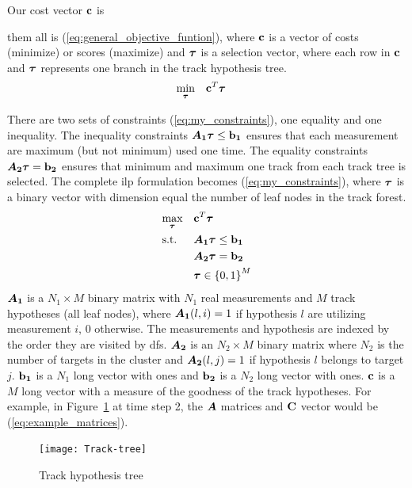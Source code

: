 
Our cost vector \(\boldsymbol{\mathbf{c}}\) is 

 them all is (\ref{eq:general_objective_funtion}), where \(\boldsymbol{\mathbf{c}}\) is a vector of costs (minimize) or scores (maximize) and \(\boldsymbol{\mathbf{\tau}}\) is a selection vector, where each row in \(\boldsymbol{\mathbf{c}}\) and \(\boldsymbol{\mathbf{\tau}}\) represents one branch in the track hypothesis tree.
\begin{equation}
\begin{aligned}
& \underset{\boldsymbol{\mathbf{\tau}}}{\text{min}}
& & \boldsymbol{\mathbf{c}}^T \boldsymbol{\mathbf{\tau}}
\end{aligned}
\label{eq:general_objective_funtion}
\end{equation}

There are two sets of constraints (\ref{eq:my_constraints}), one equality and one inequality. The inequality constraints \(\bm{A_1} \boldsymbol{\mathbf{\tau}} \leq \boldsymbol{\mathbf{b_1}}\) ensures that each measurement are maximum (but not minimum) used one time. The equality constraints \(\bm{A_2} \boldsymbol{\mathbf{\tau}} = \boldsymbol{\mathbf{b_2}}\) ensures that minimum and maximum one track from each track tree is selected. The complete \gls{ilp} formulation becomes (\ref{eq:my_constraints}), where \(\boldsymbol{\mathbf{\tau}}\) is a binary vector with dimension equal the number of leaf nodes in the track forest.
\begin{equation}
\begin{aligned}
&	\underset{\boldsymbol{\mathbf{\tau}}}{\text{max}}
&&	\boldsymbol{\mathbf{c}}^T \boldsymbol{\mathbf{\tau}} \\
&	\text{s.t.}
&&	\bm{A_1} \boldsymbol{\mathbf{\tau}} \leq \boldsymbol{\mathbf{b_1}} 	\\
&&&	\bm{A_2} \boldsymbol{\mathbf{\tau}} = \boldsymbol{\mathbf{b_2}}	\\
&&&	\boldsymbol{\mathbf{\tau}} \in {\{0,1\}}^{M}
\end{aligned}
\label{eq:my_constraints}
\end{equation}
\(\bm{A_1}\) is a \(N_1 \times M\) binary matrix with \(N_1\) real measurements and \(M\) track hypotheses (all leaf nodes), where \(\bm{A_1}(l,i)=1\) if hypothesis \(l\) are utilizing measurement \(i\), \(0\) otherwise. The measurements and hypothesis are indexed by the order they are visited by \gls{dfs}. \(\bm{A_2}\) is an \(N_2 \times M\) binary matrix where \(N_2\) is the number of targets in the cluster and \(\bm{A_2}(l,j)=1\) if hypothesis \(l\) belongs to target \(j\). \(\boldsymbol{\mathbf{b_1}}\) is a \(N_1\) long vector with ones and \(\boldsymbol{\mathbf{b_2}}\) is a \(N_2\) long vector with ones. \(\boldsymbol{\mathbf{c}}\) is a \(M\) long vector with a measure of the goodness of the track hypotheses. For example, in Figure~\ref{fig:hyp-tree} at time step 2, the \(\bm{A}\) matrices and \(\boldsymbol{\mathbf{C}}\) vector would be (\ref{eq:example_matrices}).
\begin{figure}[H]
\centering
\texttt{[image: Track-tree]}
\caption{Track hypothesis tree}\label{fig:hyp-tree}
\end{figure}


